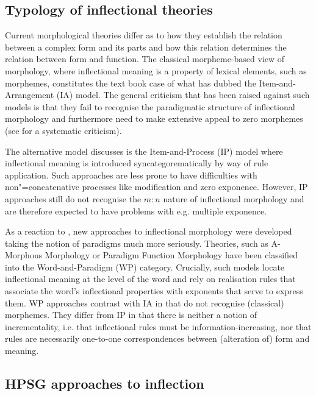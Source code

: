 \documentclass[output=paper
	        ,collection
	        ,collectionchapter
 	        ,biblatex
                ,babelshorthands
                ,newtxmath
                ,draftmode
                ,colorlinks, citecolor=brown
]{./langsci/langscibook}
\begin{document}
{\subsection{Typology of inflectional theories}
\label{sec:InflTypology}

Current morphological theories differ as to how they establish the
relation between a complex form and its parts and how this relation
determines the relation between form and function. The classical
morpheme-based view of morphology, where inflectional meaning is a
property of lexical elements, such as morphemes, constitutes the text
book case of what \cite{Hockett54} has dubbed the Item-and-Arrangement
(IA) model.  The general criticism that has been raised against such
models is that they fail to recognise the paradigmatic structure of
inflectional morphology and furthermore need to make extensive appeal
to zero morphemes (see \citealp{Anderson92} for a systematic
criticism).

The alternative model \citet{Hockett54} discusses is the
Item-and-Process (IP) model where inflectional meaning is introduced
syncategorematically by way of rule application. Such approaches
are less prone to have difficulties with non"=concatenative processes
like modification and zero exponence. However, IP approaches still do
not recognise the $m:n$ nature of inflectional morphology and are
therefore expected to have problems with e.g. multiple exponence. 


As a reaction to \citet{Matthews72}, new approaches to inflectional
morphology were developed taking the notion of paradigms much more
seriously. Theories, such as A-Morphous Morphology \citep{Anderson92}
or Paradigm Function Morphology \citep{Stump01} have been classified
into the Word-and-Paradigm (WP) category. Crucially, such models
locate inflectional meaning at the level of the word and rely on
realisation rules that associate the word's inflectional properties
with exponents that serve to express them. WP approaches contrast with
IA in that do not recognise (classical) morphemes. They differ
from IP in that there is neither a  notion of incrementality,
i.e. that inflectional rules must be information-increasing, nor that
rules are necessarily one-to-one correspondences between (alteration
of) form and meaning. 


\subsection{HPSG approaches to inflection}
\label{sec:InflHPSG}

}
\end{document}
